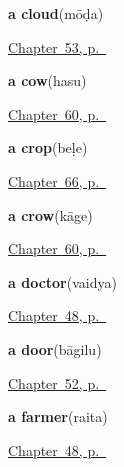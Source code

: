 \noindent\begin{minipage}[t]{\linewidth}
\raggedright
\textbf{a cloud}\enspace\emph{}\enspace(mōḍa)\par
\footnotesize \hyperref[ch:ka-sky]{Chapter~53, p.~\pageref*{ch:ka-sky}}
\end{minipage}\par\smallskip

\noindent\begin{minipage}[t]{\linewidth}
\raggedright
\textbf{a cow}\enspace\emph{}\enspace(hasu)\par
\footnotesize \hyperref[ch:ka-animals]{Chapter~60, p.~\pageref*{ch:ka-animals}}
\end{minipage}\par\smallskip

\noindent\begin{minipage}[t]{\linewidth}
\raggedright
\textbf{a crop}\enspace\emph{}\enspace(beḷe)\par
\footnotesize \hyperref[ch:ka-field]{Chapter~66, p.~\pageref*{ch:ka-field}}
\end{minipage}\par\smallskip

\noindent\begin{minipage}[t]{\linewidth}
\raggedright
\textbf{a crow}\enspace\emph{}\enspace(kāge)\par
\footnotesize \hyperref[ch:ka-animals]{Chapter~60, p.~\pageref*{ch:ka-animals}}
\end{minipage}\par\smallskip

\noindent\begin{minipage}[t]{\linewidth}
\raggedright
\textbf{a doctor}\enspace\emph{}\enspace(vaidya)\par
\footnotesize \hyperref[ch:ka-roles]{Chapter~48, p.~\pageref*{ch:ka-roles}}
\end{minipage}\par\smallskip

\noindent\begin{minipage}[t]{\linewidth}
\raggedright
\textbf{a door}\enspace\emph{}\enspace(bāgilu)\par
\footnotesize \hyperref[ch:ka-welcome]{Chapter~52, p.~\pageref*{ch:ka-welcome}}
\end{minipage}\par\smallskip

\noindent\begin{minipage}[t]{\linewidth}
\raggedright
\textbf{a farmer}\enspace\emph{}\enspace(raita)\par
\footnotesize \hyperref[ch:ka-roles]{Chapter~48, p.~\pageref*{ch:ka-roles}}
\end{minipage}\par\smallskip


